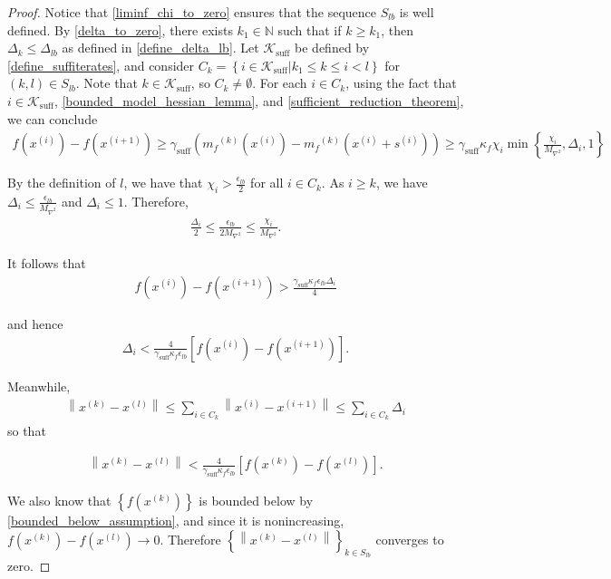 \documentclass{article}
\theoremstyle{case}
\numberwithin{theorem}{subsection}
\newcommand{\dk}{\Delta_k}
\newcommand{\gammabi}{\gamma_{\textrm{suff}}}
\newcommand{\maxhessian}{{M_{\nabla^2}}}
\newcommand{\mfk}{{{m}_f}^{(k)}}
\newcommand{\naturals}{\mathbb N}
\newcommand{\xk}{x^{(k)}}
\newcommand{\xl}{{x^{(l)}}}
\newcommand{\suffiterates}{{\mathcal K_{\textrm{suff}}}}
\begin{document}
\begin{proof}
Notice that \cref{liminf_chi_to_zero} ensures that the sequence $S_{lb}$ is well defined.
By \cref{delta_to_zero}, there exists $k_1 \in \naturals$ such that if $k \ge k_1$, then $\dk \le \Delta_{lb}$ as defined in \cref{define_delta_lb}.
Let $\suffiterates$ be defined by \cref{define_suffiterates}, and consider
$C_k = \left\{i \in \suffiterates | k_1 \le k \le i < l \right\}$ for $(k, l) \in S_{lb}$.
Note that $k \in \suffiterates$, so $C_k \ne \emptyset $.
For each $i \in C_k$, using the fact that $i \in \suffiterates$, \cref{bounded_model_hessian_lemma}, and \cref{sufficient_reduction_theorem}, we can conclude
\begin{align*}
f\left(x^{(i)}\right) - f\left(x^{(i+1)}\right) 
\ge \gammabi \left( \mfk\left(x^{(i)}\right) - \mfk\left(x^{(i)} + s^{(i)}\right) \right) 
\ge \gammabi \kappa_f \chi_i \min\left\{\frac{\chi_{i}}{\maxhessian}, \Delta_i, 1\right\} 
\end{align*}

By the definition of $l$, we have that $\chi_i > \frac{\epsilon_{lb}}{2}$ for all $i \in C_k$.
As $i \ge k$, we have $\Delta_i \le \frac{\epsilon_{lb}}{\maxhessian}$ and $\Delta_i \le 1$.
Therefore,
\begin{align*}
\frac{\Delta_i}{2} \le \frac{\epsilon_{lb}}{2 \maxhessian} \le \frac{\chi_i}{\maxhessian}.
\end{align*}

It follows that
\begin{align*}
f\left(x^{(i)}\right) - f\left(x^{(i+1)}\right) > \frac{\gammabi \kappa_f \epsilon_{lb} \Delta_i}{4}
\end{align*}

and hence
\begin{align*}
\Delta_i < \frac{4}{\gammabi \kappa_f \epsilon_{lb}} \left[ f\left(x^{(i)}\right) - f\left(x^{(i+1)}\right)\right].
\end{align*}

Meanwhile,
\begin{align*}
\left\|\xk - \xl\right\| \le \sum_{i \in C_k}\left\|x^{(i)} - x^{(i+1)}\right\| \le \sum_{i \in C_k} \Delta_i
\end{align*}
so that

\begin{align}
\left\|\xk - \xl\right\| < \frac{4}{\gammabi \kappa_f \epsilon_{lb}} \left[ f\left(\xk\right) - f\left(\xl\right)\right].
\end{align}

We also know that $\left\{f\left(\xk\right)\right\}$ is bounded below by \cref{bounded_below_assumption}, 
and since it is nonincreasing, $f\left(\xk\right)  - f\left(\xl\right) \to 0$.
Therefore $\left\{\left\|\xk - \xl\right\|\right\}_{k \in S_{lb}}$ converges to zero.
\end{proof}
\end{document}
